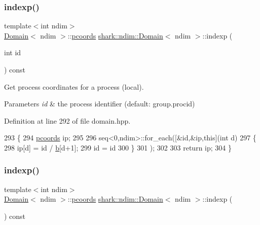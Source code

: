 \subsubsection{\texorpdfstring{indexp()}{indexp()}\hspace{0.1cm}{\footnotesize\ttfamily [1/2]}}
{\footnotesize\ttfamily template$<$int ndim$>$ \\
\hyperlink{classshark_1_1ndim_1_1_domain}{Domain}$<$ ndim $>$\+::\hyperlink{classshark_1_1ndim_1_1_domain_a9684ccd8af33cff7639c782290ac37ee}{pcoords} \hyperlink{classshark_1_1ndim_1_1_domain}{shark\+::ndim\+::\+Domain}$<$ ndim $>$\+::indexp (\begin{DoxyParamCaption}\item[{int}]{id }\end{DoxyParamCaption}) const\hspace{0.3cm}{\ttfamily [inline]}}

Get process coordinates for a process (local). 
\begin{DoxyParams}{Parameters}
{\em id} & the process identifier (default\+: group.\+procid) \\
\hline
\end{DoxyParams}


Definition at line 292 of file domain.\+hpp.


\begin{DoxyCode}
293         \{
294             \hyperlink{classshark_1_1ndim_1_1_domain_a9684ccd8af33cff7639c782290ac37ee}{pcoords} ip;
295 
296             seq<0,ndim>::for\_each([&\textcolor{keywordtype}{id},&ip,\textcolor{keyword}{this}](\textcolor{keywordtype}{int} d)
297             \{
298                 ip[d] = \textcolor{keywordtype}{id} / \hyperlink{classshark_1_1ndim_1_1_domain_a3b9ed7ea09cc2d90575a43f92cc4e105}{b}[d+1];
299                 \textcolor{keywordtype}{id} = \textcolor{keywordtype}{id} %
300             \}
301             );
302 
303             \textcolor{keywordflow}{return} ip;
304         \}
\end{DoxyCode}
\hypertarget{classshark_1_1ndim_1_1_domain_ab8a7d1fa990b118f316f1e630e86b203}{}\label{classshark_1_1ndim_1_1_domain_ab8a7d1fa990b118f316f1e630e86b203} 
\subsubsection{\texorpdfstring{indexp()}{indexp()}\hspace{0.1cm}{\footnotesize\ttfamily [2/2]}}
{\footnotesize\ttfamily template$<$int ndim$>$ \\
\hyperlink{classshark_1_1ndim_1_1_domain}{Domain}$<$ ndim $>$\+::\hyperlink{classshark_1_1ndim_1_1_domain_a9684ccd8af33cff7639c782290ac37ee}{pcoords} \hyperlink{classshark_1_1ndim_1_1_domain}{shark\+::ndim\+::\+Domain}$<$ ndim $>$\+::indexp (\begin{DoxyParamCaption}{ }\end{DoxyParamCaption}) const\hspace{0.3cm}{\ttfamily [inline]}}



